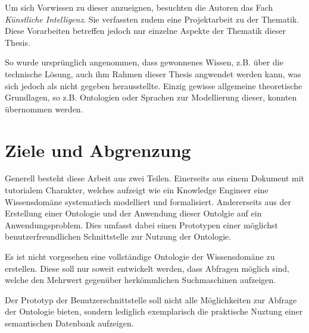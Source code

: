 Um sich Vorwissen zu dieser anzueignen, besuchten die Autoren das Fach \textit{Künstliche Intelligenz}. Sie verfassten zudem eine Projektarbeit zu der Thematik. Diese Vorarbeiten betreffen jedoch nur einzelne Aspekte der Thematik dieser Thesis.

So wurde ursprünglich angenommen, dass gewonnenes Wissen, z.B. über die technische Lösung, auch ihm Rahmen dieser Thesis angwendet werden kann, was sich jedoch als nicht gegeben herausstellte. Einzig gewisse allgemeine theoretische Grundlagen, so z.B. Ontologien oder Sprachen zur Modellierung dieser, konnten übernommen werden.

\section{Ziele und Abgrenzung}
\label{sec:aufgabe_ziele}
Generell besteht diese Arbeit aus zwei Teilen. Einerseits aus einem Dokument mit tutorialem Charakter, welches aufzeigt wie ein Knowledge Engineer eine Wissensdomäne systematisch modelliert und formalisiert. Andererseits aus der Erstellung einer Ontologie und der Anwendung dieser Ontolgie auf ein Anwendungsproblem. Dies umfasst dabei einen Prototypen einer möglichst benutzerfreundlichen Schnittstelle zur Nutzung der Ontologie.

Es ist nicht vorgesehen eine vollständige Ontologie der Wissensdomäne zu erstellen. Diese soll nur soweit entwickelt werden, dass Abfragen möglich sind, welche den Mehrwert gegenüber herkömmlichen Suchmaschinen aufzeigen.

Der Prototyp der Benutzerschnittstelle soll nicht alle Möglichkeiten zur Abfrage der Ontologie bieten, sondern lediglich exemplarisch die praktische Nuztung einer semantischen Datenbank aufzeigen.

